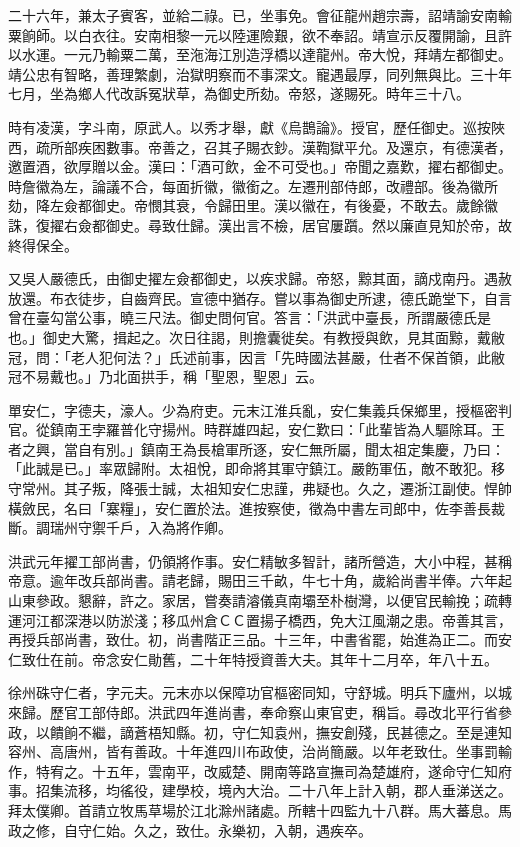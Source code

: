 \begin{pinyinscope}
二十六年，兼太子賓客，並給二祿。已，坐事免。會征龍州趙宗壽，詔靖諭安南輸粟餉師。以白衣往。安南相黎一元以陸運險艱，欲不奉詔。靖宣示反覆開諭，且許以水運。一元乃輸粟二萬，至沲海江別造浮橋以達龍州。帝大悅，拜靖左都御史。靖公忠有智略，善理繁劇，治獄明察而不事深文。寵遇最厚，同列無與比。三十年七月，坐為鄉人代改訴冤狀草，為御史所劾。帝怒，遂賜死。時年三十八。

時有凌漢，字斗南，原武人。以秀才舉，獻《烏鵲論》。授官，歷任御史。巡按陜西，疏所部疾困數事。帝善之，召其子賜衣鈔。漢鞫獄平允。及還京，有德漢者，邀置酒，欲厚贈以金。漢曰：「酒可飲，金不可受也。」帝聞之嘉歎，擢右都御史。時詹徽為左，論議不合，每面折徽，徽銜之。左遷刑部侍郎，改禮部。後為徽所劾，降左僉都御史。帝憫其衰，令歸田里。漢以徽在，有後憂，不敢去。歲餘徽誅，復擢右僉都御史。尋致仕歸。漢出言不檢，居官屢躓。然以廉直見知於帝，故終得保全。

又吳人嚴德氏，由御史擢左僉都御史，以疾求歸。帝怒，黥其面，謫戍南丹。遇赦放還。布衣徒步，自齒齊民。宣德中猶存。嘗以事為御史所逮，德氏跪堂下，自言曾在臺勾當公事，曉三尺法。御史問何官。答言：「洪武中臺長，所謂嚴德氏是也。」御史大驚，揖起之。次日往謁，則擔囊徙矣。有教授與飲，見其面黥，戴敝冠，問：「老人犯何法？」氏述前事，因言「先時國法甚嚴，仕者不保首領，此敝冠不易戴也。」乃北面拱手，稱「聖恩，聖恩」云。

單安仁，字德夫，濠人。少為府吏。元末江淮兵亂，安仁集義兵保鄉里，授樞密判官。從鎮南王孛羅普化守揚州。時群雄四起，安仁歎曰：「此輩皆為人驅除耳。王者之興，當自有別。」鎮南王為長槍軍所逐，安仁無所屬，聞太祖定集慶，乃曰：「此誠是已。」率眾歸附。太祖悅，即命將其軍守鎮江。嚴飭軍伍，敵不敢犯。移守常州。其子叛，降張士誠，太祖知安仁忠謹，弗疑也。久之，遷浙江副使。悍帥橫斂民，名曰「寨糧」，安仁置於法。進按察使，徵為中書左司郎中，佐李善長裁斷。調瑞州守禦千戶，入為將作卿。

洪武元年擢工部尚書，仍領將作事。安仁精敏多智計，諸所營造，大小中程，甚稱帝意。逾年改兵部尚書。請老歸，賜田三千畝，牛七十角，歲給尚書半俸。六年起山東參政。懇辭，許之。家居，嘗奏請濬儀真南壩至朴樹灣，以便官民輸挽；疏轉運河江都深港以防淤淺；移瓜州倉ＣＣ置揚子橋西，免大江風潮之患。帝善其言，再授兵部尚書，致仕。初，尚書階正三品。十三年，中書省罷，始進為正二。而安仁致仕在前。帝念安仁勛舊，二十年特授資善大夫。其年十二月卒，年八十五。

徐州硃守仁者，字元夫。元末亦以保障功官樞密同知，守舒城。明兵下廬州，以城來歸。歷官工部侍郎。洪武四年進尚書，奉命察山東官吏，稱旨。尋改北平行省參政，以饋餉不繼，謫蒼梧知縣。初，守仁知袁州，撫安創殘，民甚德之。至是連知容州、高唐州，皆有善政。十年進四川布政使，治尚簡嚴。以年老致仕。坐事罰輸作，特宥之。十五年，雲南平，改威楚、開南等路宣撫司為楚雄府，遂命守仁知府事。招集流移，均徭役，建學校，境內大治。二十八年上計入朝，郡人垂涕送之。拜太僕卿。首請立牧馬草場於江北滁州諸處。所轄十四監九十八群。馬大蕃息。馬政之修，自守仁始。久之，致仕。永樂初，入朝，遇疾卒。


\end{pinyinscope}
